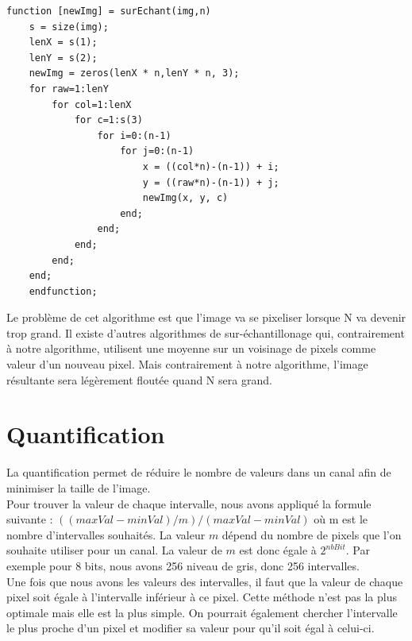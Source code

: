 \documentclass[a4paper,11pt]{article}
\begin{document}
  \begin{lstlisting}[caption=Fonction permettant le sur-échantillonnement d'une image]
    function [newImg] = surEchant(img,n)
    s = size(img);
    lenX = s(1);
    lenY = s(2);
    newImg = zeros(lenX * n,lenY * n, 3);
    for raw=1:lenY
        for col=1:lenX
            for c=1:s(3)
                for i=0:(n-1)
                    for j=0:(n-1)
                        x = ((col*n)-(n-1)) + i;
                        y = ((raw*n)-(n-1)) + j;
                        newImg(x, y, c)
                    end;
                end;
            end;
        end;
    end;
    endfunction;
  \end{lstlisting}
  
  Le problème de cet algorithme est que l'image va se pixeliser lorsque N va devenir trop grand. Il existe 
  d'autres algorithmes de sur-échantillonage qui, contrairement à notre algorithme, utilisent une moyenne
  sur un voisinage de pixels comme valeur d'un nouveau pixel. Mais contrairement à notre algorithme, l'image 
  résultante sera légèrement floutée quand N sera grand.
  
  
  \section{Quantification}
  La quantification permet de réduire le nombre de valeurs dans un canal afin de minimiser la taille de l'image.\\
  
  Pour trouver la valeur de chaque intervalle, nous avons appliqué la formule suivante : $((maxVal - minVal) / m) / (maxVal - minVal)$
  où m est le nombre d'intervalles souhaités. La valeur $m$ dépend du nombre de pixels que l'on souhaite utiliser
  pour un canal. La valeur de $m$ est donc égale à $2^{nbBit}$. Par exemple pour 8 bits, nous avons 256 
  niveau de gris, donc 256 intervalles.\\
  
  Une fois que nous avons les valeurs des intervalles, il faut que la valeur de chaque pixel soit égale à l'intervalle 
  inférieur à ce pixel. Cette méthode n'est pas la plus optimale mais elle est la plus simple. On pourrait également 
  chercher l'intervalle le plus proche d'un pixel et modifier sa valeur pour qu'il soit égal à celui-ci.
  
\end{document}
